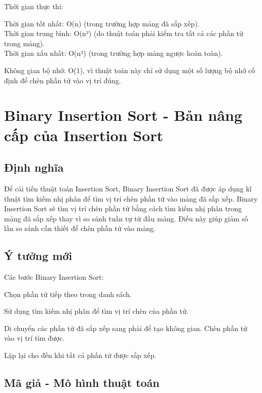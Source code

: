 \documentclass[12pt,a4paper]{report}
\begin{document}
{Thời gian thực thi:

\hspace{0.5cm} Thời gian tốt nhất: O(n) (trong trường hợp mảng đã sắp xếp).\\

\hspace{0.5cm} Thời gian trung bình: O(n²) (do thuật toán phải kiểm tra tất cả các phần tử trong mảng).\\

\hspace{0.5cm} Thời gian xấu nhất: O(n²) (trong trường hợp mảng ngược hoàn toàn).\\}

{Không gian bộ nhớ: O(1), vì thuật toán này chỉ sử dụng một số lượng bộ nhớ cố định để chèn phần tử vào vị trí đúng.}



\section{ Binary Insertion Sort - Bản nâng cấp của Insertion Sort}
 
\subsection{ Định nghĩa}

{\large \hspace{1cm} Để cải tiến thuật toán Insertion Sort, Binary Insertion Sort đã được áp dụng kĩ thuật tìm kiếm nhị phân để tìm vị trí chèn phần tử vào mảng đã sắp xếp. Binary Insertion Sort sẽ tìm vị trí chèn phần tử bằng cách tìm kiếm nhị phân trong mảng đã sắp xếp thay vì so sánh tuần tự từ đầu mảng. Điều này giúp giảm số lần so sánh cần thiết để chèn phần tử vào mảng.}

\subsection {Ý tưởng mới}

Các bước Binary Insertion Sort:

Chọn phần tử tiếp theo trong danh sách.

Sử dụng tìm kiếm nhị phân để tìm vị trí chèn của phần tử.

Di chuyển các phần tử đã sắp xếp sang phải để tạo không gian.
Chèn phần tử vào vị trí tìm được.

Lặp lại cho đến khi tất cả phần tử được sắp xếp.

\subsection{ Mã giả - Mô hình thuật toán}
\end{document}
